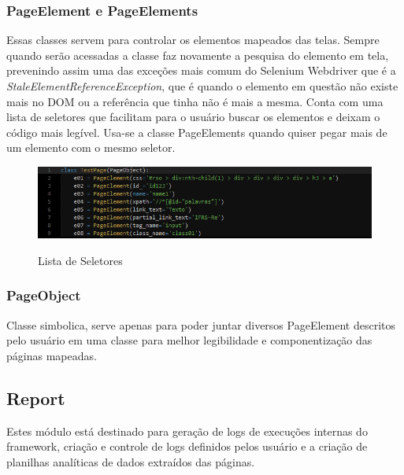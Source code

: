             \subsubsection{PageElement e PageElements}
            \label{PageElement}
                Essas classes servem para controlar os elementos mapeados das telas. Sempre quando serão acessadas a classe faz novamente a pesquisa
                do elemento em tela, prevenindo assim uma das exceções mais comum do Selenium Webdriver que é a \emph{StaleElementReferenceException},
                que é quando o elemento em questão não existe mais no DOM ou a referência que tinha não é mais a mesma. Conta com uma lista de seletores
                que facilitam para o usuário buscar os elementos e deixam o código mais legível. Usa-se a classe PageElements quando quiser pegar mais
                de um elemento com o mesmo seletor.

                \begin{figure}[H]
                    \vspace*{0,3cm}
                    \centering
                    \caption{Lista de Seletores}
                    \includegraphics[width=1\textwidth]{./04-figuras/selectors}
                    \label{fig:selectors.png}
                \end{figure}

            \subsubsection{PageObject}
                Classe simbolica, serve apenas para poder juntar diversos PageElement descritos pelo usuário em uma classe para melhor
                legibilidade e componentização das páginas mapeadas.

        \subsection{Report}

            Estes módulo está destinado para geração de logs de execuções internas do framework, criação e controle
            de logs definidos pelos usuário e a criação de planilhas analíticas de dados extraídos das páginas.

